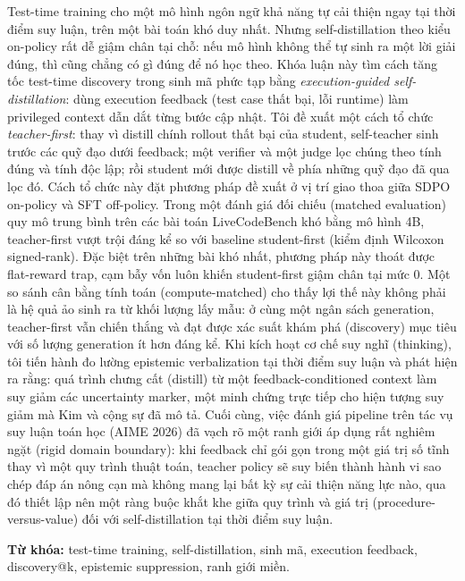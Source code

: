 Test-time training cho một mô hình ngôn ngữ khả năng tự cải thiện ngay tại
thời điểm suy luận, trên một bài toán khó duy nhất. Nhưng self-distillation
theo kiểu on-policy rất dễ giậm chân tại chỗ: nếu mô hình không thể tự sinh
ra một lời giải đúng, thì cũng chẳng có gì đúng để nó học theo. Khóa luận
này tìm cách tăng tốc test-time discovery trong sinh mã phức tạp bằng
\emph{execution-guided self-distillation}: dùng execution feedback
(test case thất bại, lỗi runtime) làm privileged context dẫn dắt từng
bước cập nhật. Tôi đề xuất một cách tổ chức \emph{teacher-first}:
thay vì distill chính rollout thất bại của student, self-teacher sinh
trước các quỹ đạo dưới feedback; một verifier và một judge lọc chúng theo
tính đúng và tính độc lập; rồi student mới được distill về phía những quỹ
đạo đã qua lọc đó. Cách tổ chức này đặt phương pháp đề xuất ở vị trí giao
thoa giữa SDPO on-policy và SFT off-policy. Trong một đánh giá đối chiếu
(matched evaluation) quy mô trung bình trên các bài toán LiveCodeBench khó
bằng mô hình 4B, teacher-first vượt trội đáng kể so với baseline
student-first (kiểm định Wilcoxon signed-rank). Đặc biệt trên những bài khó
nhất, phương pháp này thoát được flat-reward trap, cạm bẫy vốn luôn
khiến student-first giậm chân tại mức 0. Một so sánh cân bằng tính toán
(compute-matched) cho thấy lợi thế này không phải là hệ quả ảo sinh ra từ
khối lượng lấy mẫu: ở cùng một ngân sách generation, teacher-first vẫn
chiến thắng và đạt được xác suất khám phá (discovery) mục tiêu với số
lượng generation ít hơn đáng kể. Khi kích hoạt cơ chế suy nghĩ (thinking),
tôi tiến hành đo lường epistemic verbalization tại thời điểm suy luận và
phát hiện ra rằng: quá trình chưng cất (distill) từ một feedback-conditioned
context làm suy giảm các uncertainty marker, một minh chứng trực tiếp
cho hiện tượng suy giảm mà Kim và cộng sự đã mô tả. Cuối cùng, việc đánh
giá pipeline trên tác vụ suy luận toán học (AIME 2026) đã vạch rõ một ranh
giới áp dụng rất nghiêm ngặt (rigid domain boundary): khi feedback chỉ gói
gọn trong một giá trị số tĩnh thay vì một quy trình thuật toán, teacher
policy sẽ suy biến thành hành vi sao chép đáp án nông cạn mà không mang
lại bất kỳ sự cải thiện năng lực nào, qua đó thiết lập nên một ràng buộc
khắt khe giữa quy trình và giá trị (procedure-versus-value) đối với
self-distillation tại thời điểm suy luận.

\vspace{0.5cm}
\textbf{Từ khóa:} test-time training, self-distillation, sinh mã,
execution feedback, discovery@k, epistemic suppression, ranh giới miền.
